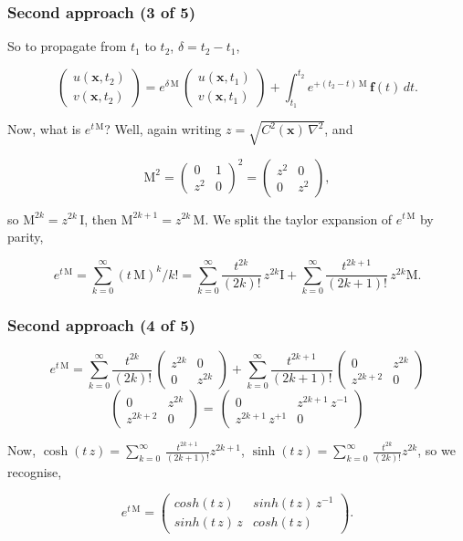 \documentclass{beamer}
\newcommand{\twomat}[4]{ \left( \begin{array}{cc} #1 & #2 \\ #3 & #4  \end{array} \right) }
\newcommand{\twovec}[2]{ \left( \begin{array}{c} #1  \\ #2   \end{array} \right) }
\begin{document}
\begin{frame}
\frametitle{Second approach (3 of 5)}
\begin{flushleft}
So to propagate from $t_1$ to $t_2$, $\delta = t_2-t_1$,
\end{flushleft}
\begin{equation*}
\twovec{ u(\mathbf{x},t_2) }{ v(\mathbf{x},t_2) }  = e^{\delta \, \textrm{M}} \, \twovec{ u(\mathbf{x},t_1) }{ v(\mathbf{x},t_1) } + \int_{t_1}^{t_2}  e^{+(t_2-t) \, \textrm{M}} \, \textbf{f}(t) \, dt.
\end{equation*}
\begin{flushleft}
Now, what is $e^{t \, \textrm{M}}$? Well, again writing $z = \sqrt{C^2(\mathbf{x}) \, \nabla^2}$, and
\end{flushleft}
\begin{equation*}
\textrm{M}^2 = \twomat{0}{1}{ z^2 }{0}^2 = \twomat{z^2}{0}{0}{z^2},
\end{equation*}
\begin{flushleft}
so $\textrm{M}^{2k} = z^{2k} \, \textrm{I}$, then $\textrm{M}^{2k+1} = z^{2k} \, \textrm{M}$. We split the taylor expansion of $e^{t \, \textrm{M}}$ by parity,
\end{flushleft}
\begin{equation*}
e^{t \, \textrm{M}} =  \sum_{k=0}^\infty (t \, \textrm{M})^k/k! =
\sum_{k=0}^\infty \frac{t^{2k}}{(2k)!} \, z^{2k} \textrm{I} +
\sum_{k=0}^\infty \frac{t^{2k+1}}{(2k+1)!} \, z^{2k} \textrm{M}.
\end{equation*}
\end{frame}



\begin{frame}
\frametitle{Second approach (4 of 5)}
\begin{equation*}
e^{t \, \textrm{M}} =
\sum_{k=0}^\infty \frac{t^{2k}}{(2k)!} \, \twomat{z^{2k}}{0}{0}{z^{2k}}+
\sum_{k=0}^\infty \frac{t^{2k+1}}{(2k+1)!} \, \twomat {0}{z^{2k}}{z^{2k+2}}{0}
\end{equation*}
\begin{equation*}
\twomat {0}{z^{2k}}{z^{2k+2}}{0}=  \, \twomat {0}{z^{2k+1} \, z^{-1}}{z^{2k+1}\, z^{+1}}{0}
\end{equation*}
\begin{flushleft}
Now, $\cosh{(t \, z)} = \sum_{k=0}^{\infty} \, \frac{t^{2k+1}}{(2k+1)!} z^{2k+1} $, $\sinh{(t \, z)} = \sum_{k=0}^{\infty} \, \frac{t^{2k}}{(2k)!} z^{2k}$, so we recognise,
\end{flushleft}
\begin{equation*}
e^{t \, \textrm{M}} = \twomat{cosh(t \, z )} {sinh(t \, z) \, z^{-1}} {sinh(t \, z) \,z} {cosh(t \, z	)}.
\end{equation*}
\end{frame}
\end{document}
